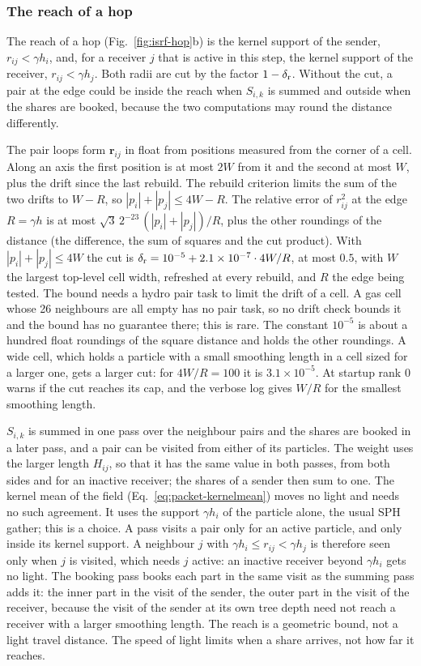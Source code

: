 \subsubsection{The reach of a hop}
\label{sec:isrf-reach}

The reach of a hop (Fig.~\ref{fig:isrf-hop}b) is the kernel support of the
sender, $r_{ij}<\gamma h_i$,
and, for a receiver $j$ that is active in this step, the kernel support of the
receiver, $r_{ij}<\gamma h_j$. Both radii are cut by the factor
$1-\delta_{\rm r}$. Without the cut, a pair at the edge could be inside
the reach when $S_{i,k}$ is summed and outside when the shares are booked,
because the two computations may round the distance differently.

The pair loops form $\boldsymbol{r}_{ij}$ in float from positions measured from
the corner of a cell. Along an axis the first position is at most $2W$ from
it and the second at most $W$, plus the drift since the last rebuild. The
rebuild criterion limits the sum of the two drifts to $W-R$, so
$|p_i|+|p_j|\le 4W-R$. The relative error of $r_{ij}^2$ at the edge $R=\gamma h$ is at most
$\sqrt{3}\,2^{-23}\,(|p_i|+|p_j|)/R$, plus the other roundings of the distance
(the difference, the sum of squares and the cut product). With
$|p_i|+|p_j|\le 4W$ the cut is
$\delta_{\rm r}=10^{-5}+2.1\times10^{-7}\cdot 4W/R$, at most $0.5$, with $W$
the largest top-level cell width, refreshed at every rebuild, and $R$ the edge
being tested. The bound needs a hydro pair task to limit the drift of a cell. A
gas cell whose 26 neighbours are all empty has no pair task, so no drift check
bounds it and the bound has no guarantee there; this is rare. The constant $10^{-5}$ is about a hundred float roundings of the
square distance and holds the other roundings. A wide cell, which holds a particle with a small
smoothing length in a cell sized for a larger one, gets a larger cut: for
$4W/R=100$ it is $3.1\times10^{-5}$. At startup rank 0 warns if the cut reaches its cap, and the verbose log gives
$W/R$ for the smallest smoothing length.

$S_{i,k}$ is summed in one pass over the neighbour pairs and the shares are
booked in a later pass, and a pair can be visited from either of its
particles. The weight uses the larger length $H_{ij}$, so that it has the same
value in both passes, from both sides and for an inactive receiver; the shares
of a sender then sum to one. The kernel mean of the field
(Eq.~\eqref{eq:packet-kernelmean}) moves no light and needs no such
agreement. It uses the support $\gamma h_i$ of the particle alone, the usual
SPH gather; this is a choice. A pass visits a pair only for an active
particle, and only inside its kernel support. A neighbour $j$ with
$\gamma h_i\le r_{ij}<\gamma h_j$ is therefore seen only when $j$ is visited,
which needs $j$ active: an inactive receiver beyond $\gamma h_i$ gets no
light. The booking pass books each part in the same visit as the summing pass
adds it: the inner part in the visit of the sender, the outer part in the
visit of the receiver, because the visit of the sender at its own tree depth
need not reach a receiver with a larger smoothing length. The reach is a geometric bound, not a light travel distance. The speed
of light limits when a share arrives, not how far it reaches.

